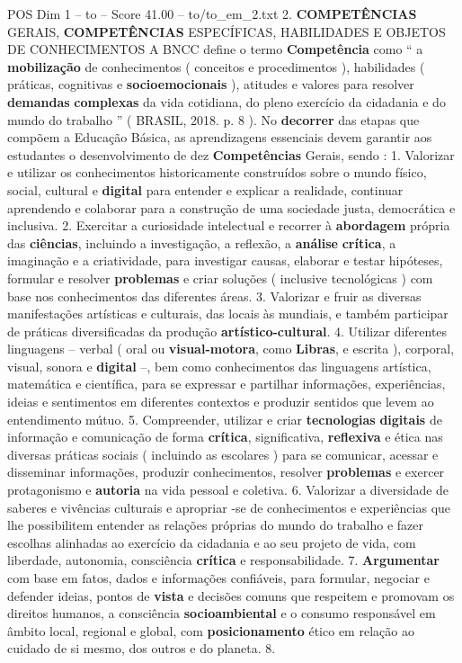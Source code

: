 \begin{textsample}{POS Dim 1 – to – Score 41.00 – to/to\_em\_2.txt}  \label{ex:f1_pos_258}
2. \textbf{COMPETÊNCIAS} GERAIS, \textbf{COMPETÊNCIAS} ESPECÍFICAS, HABILIDADES E OBJETOS DE CONHECIMENTOS A BNCC define o termo \textbf{Competência} como “ a \textbf{mobilização} de conhecimentos ( conceitos e procedimentos ), habilidades ( práticas, cognitivas e \textbf{socioemocionais} ), atitudes e valores para resolver \textbf{demandas} \textbf{complexas} da vida cotidiana, do pleno exercício da cidadania e do mundo do trabalho ” ( BRASIL, 2018. p. 8 ).
No \textbf{decorrer} das etapas que compõem a Educação Básica, as aprendizagens essenciais devem garantir aos estudantes o desenvolvimento de dez \textbf{Competências} Gerais, sendo : 1.
Valorizar e utilizar os conhecimentos historicamente construídos sobre o mundo físico, social, cultural e \textbf{digital} para entender e explicar a realidade, continuar aprendendo e colaborar para a construção de uma sociedade justa, democrática e inclusiva. 2.
Exercitar a curiosidade intelectual e recorrer à \textbf{abordagem} própria das \textbf{ciências}, incluindo a investigação, a reflexão, a \textbf{análise} \textbf{crítica}, a imaginação e a criatividade, para investigar causas, elaborar e testar hipóteses, formular e resolver \textbf{problemas} e criar soluções ( inclusive tecnológicas ) com base nos conhecimentos das diferentes áreas. 3.
Valorizar e fruir as diversas manifestações artísticas e culturais, das locais às mundiais, e também participar de práticas diversificadas da produção \textbf{artístico-cultural}. 4.
Utilizar diferentes linguagens – verbal ( oral ou \textbf{visual-motora}, como \textbf{Libras}, e escrita ), corporal, visual, sonora e \textbf{digital} –, bem como conhecimentos das linguagens artística, matemática e científica, para se expressar e partilhar informações, experiências, ideias e sentimentos em diferentes contextos e produzir sentidos que levem ao entendimento mútuo. 5.
Compreender, utilizar e criar \textbf{tecnologias} \textbf{digitais} de informação e comunicação de forma \textbf{crítica}, significativa, \textbf{reflexiva} e ética nas diversas práticas sociais ( incluindo as escolares ) para se comunicar, acessar e disseminar informações, produzir conhecimentos, resolver \textbf{problemas} e exercer protagonismo e \textbf{autoria} na vida pessoal e coletiva. 6.
Valorizar a diversidade de saberes e vivências culturais e apropriar -se de conhecimentos e experiências que lhe possibilitem entender as relações próprias do mundo do trabalho e fazer escolhas alinhadas ao exercício da cidadania e ao seu projeto de vida, com liberdade, autonomia, consciência \textbf{crítica} e responsabilidade. 7. \textbf{Argumentar} com base em fatos, dados e informações confiáveis, para formular, negociar e defender ideias, pontos de \textbf{vista} e decisões comuns que respeitem e promovam os direitos humanos, a consciência \textbf{socioambiental} e o consumo responsável em âmbito local, regional e global, com \textbf{posicionamento} ético em relação ao cuidado de si mesmo, dos outros e do planeta. 8.

\end{textsample}
